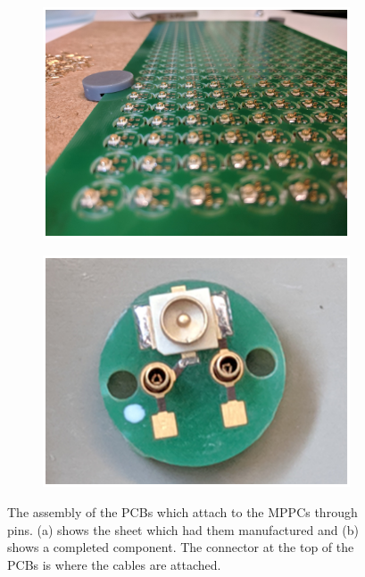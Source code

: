 \begin{figure}[!h]
\centering
\begin{subfigure}{.5\textwidth}
  \centering
  \includegraphics[width=\linewidth]{Chapter3/Figs/Raster/detCon008b_PlacingPcbs.png}
  \captionsetup{width=.9\linewidth}
  \caption{}
  \label{subFig:detCon008b_PlacingPcbs}
\end{subfigure}%
\begin{subfigure}{.5\textwidth}
  \centering
  \includegraphics[width=\linewidth]{Chapter3/Figs/Raster/detCon009b_SoloPcb.png}
  \captionsetup{width=.9\linewidth}
  \caption{}
  \label{subFig:detCon009b_SoloPcb}
\end{subfigure}
\caption{The assembly of the PCBs which attach to the MPPCs through pins. (a) shows the sheet which had them manufactured and (b) shows a completed component. The connector at the top of the PCBs is where the cables are attached. }
\label{fig:detCon_PlacingPcbs_SoloPcb}
\end{figure}

